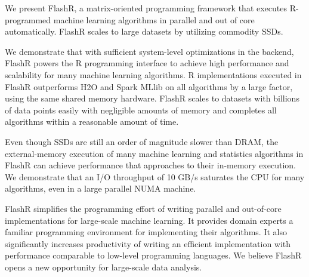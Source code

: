 We present FlashR, a matrix-oriented programming framework that executes
R-programmed machine learning algorithms in parallel and out of core
automatically. FlashR scales to large datasets by utilizing commodity SSDs.


We demonstrate that with sufficient system-level optimizations in the backend,
FlashR powers the R programming interface to achieve high performance and scalability
for many machine learning algorithms. R implementations executed in FlashR
outperforms H2O and Spark MLlib on all algorithms by a large factor, using
the same shared memory hardware. FlashR scales to datasets with billions of
data points easily with negligible amounts of memory and completes all
algorithms within a reasonable amount of time.

Even though SSDs are still an order of magnitude slower than DRAM, the external-memory
execution of many machine learning and statistics algorithms in FlashR can achieve performance
that approaches to their in-memory execution. We demonstrate that an I/O throughput
of 10 GB/s saturates the CPU for many algorithms, even in a large parallel
NUMA machine. 

FlashR simplifies the programming effort of writing
parallel and out-of-core implementations for large-scale machine learning. It
provides domain experts a familiar programming environment for implementing
their algorithms. It also significantly
increases productivity of writing an efficient implementation with performance
comparable to low-level programming languages. We believe FlashR opens
a new opportunity for large-scale data analysis.

